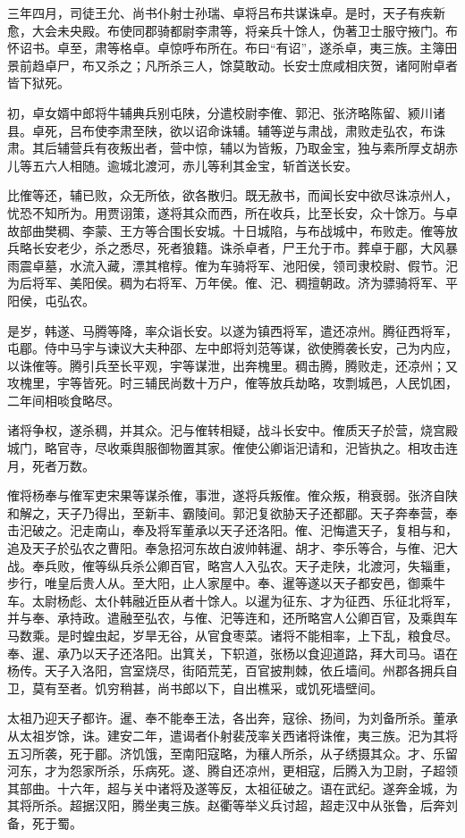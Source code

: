 \documentclass[12pt,UTF8]{ctexbook}
\begin{document}
三年四月，司徒王允、尚书仆射士孙瑞、卓将吕布共谋诛卓。是时，天子有疾新愈，大会未央殿。布使同郡骑都尉李肃等，将亲兵十馀人，伪著卫士服守掖门。布怀诏书。卓至，肃等格卓。卓惊呼布所在。布曰“有诏”，遂杀卓，夷三族。主簿田景前趋卓尸，布又杀之；凡所杀三人，馀莫敢动。长安士庶咸相庆贺，诸阿附卓者皆下狱死。

初，卓女婿中郎将牛辅典兵别屯陕，分遣校尉李傕、郭汜、张济略陈留、颍川诸县。卓死，吕布使李肃至陕，欲以诏命诛辅。辅等逆与肃战，肃败走弘农，布诛肃。其后辅营兵有夜叛出者，营中惊，辅以为皆叛，乃取金宝，独与素所厚攴胡赤儿等五六人相随。逾城北渡河，赤儿等利其金宝，斩首送长安。

比傕等还，辅已败，众无所依，欲各散归。既无赦书，而闻长安中欲尽诛凉州人，忧恐不知所为。用贾诩策，遂将其众而西，所在收兵，比至长安，众十馀万。与卓故部曲樊稠、李蒙、王方等合围长安城。十日城陷，与布战城中，布败走。傕等放兵略长安老少，杀之悉尽，死者狼籍。诛杀卓者，尸王允于市。葬卓于郿，大风暴雨震卓墓，水流入藏，漂其棺椁。傕为车骑将军、池阳侯，领司隶校尉、假节。汜为后将军、美阳侯。稠为右将军、万年侯。傕、汜、稠擅朝政。济为骠骑将军、平阳侯，屯弘农。

是岁，韩遂、马腾等降，率众诣长安。以遂为镇西将军，遣还凉州。腾征西将军，屯郿。侍中马宇与谏议大夫种邵、左中郎将刘范等谋，欲使腾袭长安，己为内应，以诛傕等。腾引兵至长平观，宇等谋泄，出奔槐里。稠击腾，腾败走，还凉州；又攻槐里，宇等皆死。时三辅民尚数十万户，傕等放兵劫略，攻剽城邑，人民饥困，二年间相啖食略尽。

诸将争权，遂杀稠，并其众。汜与傕转相疑，战斗长安中。傕质天子於营，烧宫殿城门，略官寺，尽收乘舆服御物置其家。傕使公卿诣汜请和，汜皆执之。相攻击连月，死者万数。

傕将杨奉与傕军吏宋果等谋杀傕，事泄，遂将兵叛傕。傕众叛，稍衰弱。张济自陕和解之，天子乃得出，至新丰、霸陵间。郭汜复欲胁天子还都郿。天子奔奉营，奉击汜破之。汜走南山，奉及将军董承以天子还洛阳。傕、汜悔遣天子，复相与和，追及天子於弘农之曹阳。奉急招河东故白波帅韩暹、胡才、李乐等合，与傕、汜大战。奉兵败，傕等纵兵杀公卿百官，略宫人入弘农。天子走陕，北渡河，失辎重，步行，唯皇后贵人从。至大阳，止人家屋中。奉、暹等遂以天子都安邑，御乘牛车。太尉杨彪、太仆韩融近臣从者十馀人。以暹为征东、才为征西、乐征北将军，并与奉、承持政。遣融至弘农，与傕、汜等连和，还所略宫人公卿百官，及乘舆车马数乘。是时蝗虫起，岁旱无谷，从官食枣菜。诸将不能相率，上下乱，粮食尽。奉、暹、承乃以天子还洛阳。出箕关，下轵道，张杨以食迎道路，拜大司马。语在杨传。天子入洛阳，宫室烧尽，街陌荒芜，百官披荆棘，依丘墙间。州郡各拥兵自卫，莫有至者。饥穷稍甚，尚书郎以下，自出樵采，或饥死墙壁间。

太祖乃迎天子都许。暹、奉不能奉王法，各出奔，寇徐、扬间，为刘备所杀。董承从太祖岁馀，诛。建安二年，遣谒者仆射裴茂率关西诸将诛傕，夷三族。汜为其将五习所袭，死于郿。济饥饿，至南阳寇略，为穰人所杀，从子绣摄其众。才、乐留河东，才为怨家所杀，乐病死。遂、腾自还凉州，更相寇，后腾入为卫尉，子超领其部曲。十六年，超与关中诸将及遂等反，太祖征破之。语在武纪。遂奔金城，为其将所杀。超据汉阳，腾坐夷三族。赵衢等举义兵讨超，超走汉中从张鲁，后奔刘备，死于蜀。
\end{document}

